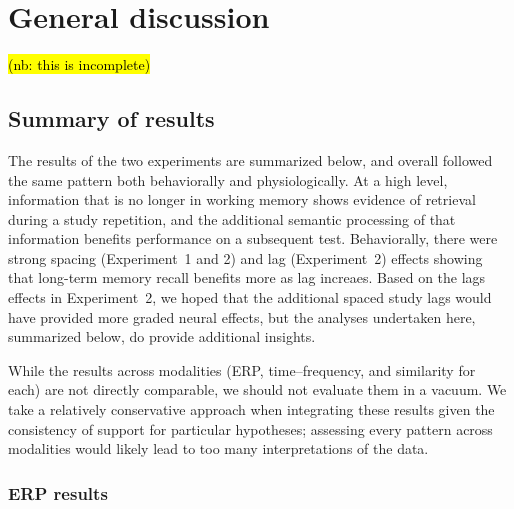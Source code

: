 
\chapter{General discussion}


\hl{(nb: this is incomplete)}

\section{Summary of results}


The results of the two experiments are summarized below, and overall followed the same pattern both behaviorally and physiologically.  At a high level, information that is no longer in working memory shows evidence of retrieval during a study repetition, and the additional semantic processing of that information benefits performance on a subsequent test.
Behaviorally, there were strong spacing (Experiment~1 and 2) and lag (Experiment~2) effects showing that long-term memory recall benefits more as lag increaes.
Based on the lags effects in Experiment~2, we hoped that the additional spaced study lags would have provided more graded neural effects, but the analyses undertaken here, summarized below, do provide additional insights.

While the results across modalities (ERP, time--frequency, and similarity for each) are not directly comparable, we should not evaluate them in a vacuum.  We take a relatively conservative approach when integrating these results given the consistency of support for particular hypotheses; assessing every pattern across modalities would likely lead to too many interpretations of the data.


\subsection{ERP results}


